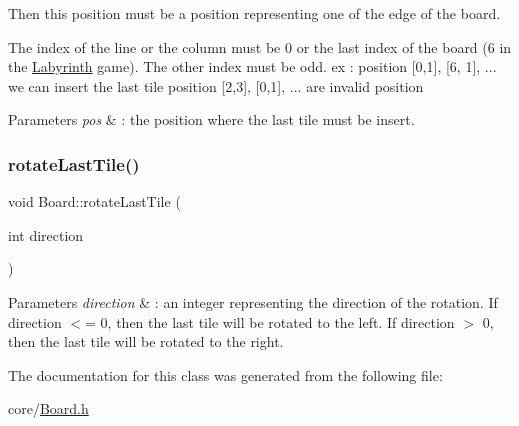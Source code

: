 Then this position must be a position representing one of the edge of the board.

The index of the line or the column must be 0 or the last index of the board (6 in the \mbox{\hyperlink{classLabyrinth}{Labyrinth}} game). The other index must be odd. ex \+: position \mbox{[}0,1\mbox{]}, \mbox{[}6, 1\mbox{]}, ... we can insert the last tile position \mbox{[}2,3\mbox{]}, \mbox{[}0,1\mbox{]}, ... are invalid position


\begin{DoxyParams}{Parameters}
{\em pos} & \+: the position where the last tile must be insert. \\
\hline
\end{DoxyParams}
\mbox{\label{classBoard_a033583c0f7abf2a3fe9626709d380570}} 
\subsubsection{\texorpdfstring{rotateLastTile()}{rotateLastTile()}}
{\footnotesize\ttfamily void Board\+::rotate\+Last\+Tile (\begin{DoxyParamCaption}\item[{int}]{direction }\end{DoxyParamCaption})}


\begin{DoxyParams}{Parameters}
{\em direction} & \+: an integer representing the direction of the rotation. If direction $<$= 0, then the last tile will be rotated to the left. If direction $>$ 0, then the last tile will be rotated to the right. \\
\hline
\end{DoxyParams}


The documentation for this class was generated from the following file\+:\begin{DoxyCompactItemize}
\item 
core/\mbox{\hyperlink{Board_8h}{Board.\+h}}\end{DoxyCompactItemize}
